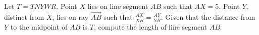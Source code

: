 Let $T=TNYWR$. Point $X$ lies on line segment $AB$ such that $AX=5$. Point $Y$, distinct from $X$, lies on ray $\overrightarrow{AB}$ such that $\frac{AX}{XB}=\frac{AY}{YB}$. Given that the distance from $Y$ to the midpoint of $AB$ is $T$, compute the length of line segment $AB$.